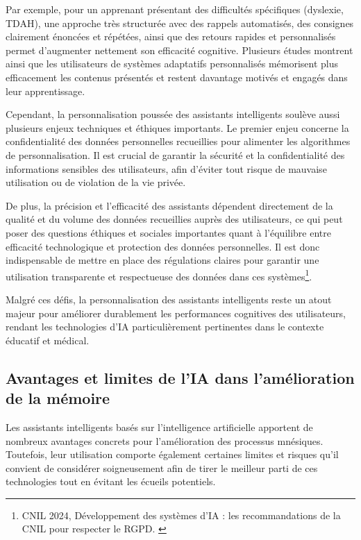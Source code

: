 \documentclass[11pt,a4paper]{report}
\begin{document}
Par exemple, pour un apprenant présentant des difficultés spécifiques (dyslexie, TDAH), une approche très structurée avec des rappels automatisés, des consignes clairement énoncées et répétées, ainsi que des retours rapides et personnalisés permet d'augmenter nettement son efficacité cognitive. Plusieurs études montrent ainsi que les utilisateurs de systèmes adaptatifs personnalisés mémorisent plus efficacement les contenus présentés et restent davantage motivés et engagés dans leur apprentissage.

Cependant, la personnalisation poussée des assistants intelligents soulève aussi plusieurs enjeux techniques et éthiques importants. Le premier enjeu concerne la confidentialité des données personnelles recueillies pour alimenter les algorithmes de personnalisation. Il est crucial de garantir la sécurité et la confidentialité des informations sensibles des utilisateurs, afin d'éviter tout risque de mauvaise utilisation ou de violation de la vie privée.

De plus, la précision et l’efficacité des assistants dépendent directement de la qualité et du volume des données recueillies auprès des utilisateurs, ce qui peut poser des questions éthiques et sociales importantes quant à l'équilibre entre efficacité technologique et protection des données personnelles. Il est donc indispensable de mettre en place des régulations claires pour garantir une utilisation transparente et respectueuse des données dans ces systèmes\footnote{CNIL 2024, Développement des systèmes d’IA : les recommandations de la CNIL pour respecter le RGPD. \cite{cnil}}.

Malgré ces défis, la personnalisation des assistants intelligents reste un atout majeur pour améliorer durablement les performances cognitives des utilisateurs, rendant les technologies d'IA particulièrement pertinentes dans le contexte éducatif et médical.

\subsection{Avantages et limites de l’IA dans l’amélioration de la mémoire}

Les assistants intelligents basés sur l’intelligence artificielle apportent de nombreux avantages concrets pour l'amélioration des processus mnésiques. Toutefois, leur utilisation comporte également certaines limites et risques qu’il convient de considérer soigneusement afin de tirer le meilleur parti de ces technologies tout en évitant les écueils potentiels.
\end{document}
